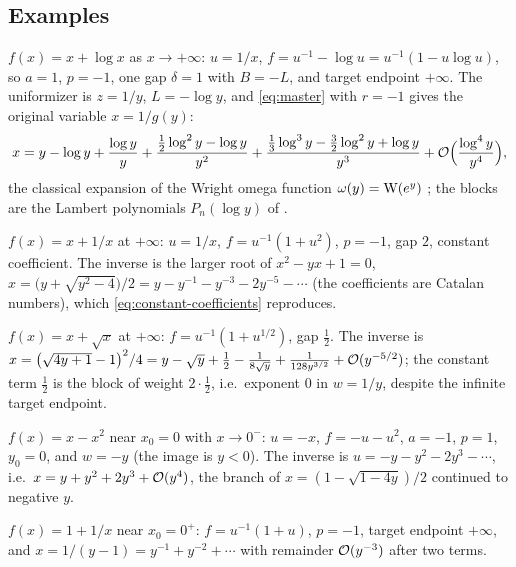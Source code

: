\subsection{Examples}

\begin{example}
$f(x)=x+\log x$ as $x\to+\infty$: $u=1/x$, $f=u^{-1}-\log u=u^{-1}(1-u\log u)$, so $a=1$, $p=-1$, one gap $\delta=1$ with $B=-L$, and target endpoint $+\infty$. The uniformizer is $z=1/y$, $L=-\log y$, and \eqref{eq:master} with $r=-1$ gives the original variable $x=1/g(y)$:
\begin{equation}
 x=y-\log y+\frac{\log y}{y}+\frac{\tfrac12\log^2y-\log y}{y^2}+\frac{\tfrac13\log^3y-\tfrac32\log^2y+\log y}{y^3}+\mathcal O\Bigl(\frac{\log^4y}{y^4}\Bigr),
 \label{eq:omega}
\end{equation}
the classical expansion of the Wright omega function $\omega(y)=\mathrm W(e^y)$ \cite{cghjk,proveit}; the blocks are the Lambert polynomials $P_n(\log y)$ of \cite{proveit}.
\end{example}

\begin{example}
$f(x)=x+1/x$ at $+\infty$: $u=1/x$, $f=u^{-1}(1+u^2)$, $p=-1$, gap $2$, constant coefficient. The inverse is the larger root of $x^2-yx+1=0$, $x=\bigl(y+\sqrt{y^2-4}\bigr)/2=y-y^{-1}-y^{-3}-2y^{-5}-\cdots$ (the coefficients are Catalan numbers), which \eqref{eq:constant-coefficients} reproduces.
\end{example}

\begin{example}
$f(x)=x+\sqrt x$ at $+\infty$: $f=u^{-1}(1+u^{1/2})$, gap $\frac12$. The inverse is $x=\bigl(\sqrt{4y+1}-1\bigr)^2/4=y-\sqrt y+\frac12-\frac1{8\sqrt y}+\frac1{128y^{3/2}}+\mathcal O(y^{-5/2})$; the constant term $\frac12$ is the block of weight $2\cdot\frac12$, i.e.\ exponent $0$ in $w=1/y$, despite the infinite target endpoint.
\end{example}

\begin{example}
$f(x)=x-x^2$ near $x_0=0$ with $x\to0^-$: $u=-x$, $f=-u-u^2$, $a=-1$, $p=1$, $y_0=0$, and $w=-y$ (the image is $y<0$). The inverse is $u=-y-y^2-2y^3-\cdots$, i.e.\ $x=y+y^2+2y^3+\mathcal O(y^4)$, the branch of $x=(1-\sqrt{1-4y})/2$ continued to negative $y$.
\end{example}

\begin{example}[A pole]
$f(x)=1+1/x$ near $x_0=0^+$: $f=u^{-1}(1+u)$, $p=-1$, target endpoint $+\infty$, and $x=1/(y-1)=y^{-1}+y^{-2}+\cdots$ with remainder $\mathcal O(y^{-3})$ after two terms.
\end{example}

